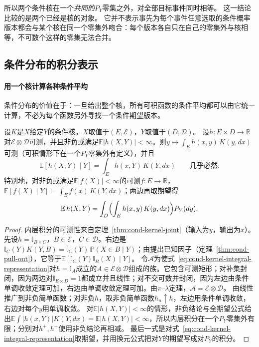 所以两个条件核在一个\emph{共同的}$P_Y$零集之外，对全部目标事件同时相等。
这一结论比较的是两个已经是核的对象。
它并不表示事先为每个事件任意选取的条件概率版本都会与某个核在同一个零集外吻合：每个版本各自只在自己的零集外与核相等，不可数个这样的零集无法合并。

\subsection{条件分布的积分表示}

\paragraph{用一个核计算各种条件平均}
条件分布的价值在于：一旦给出整个核，所有可积函数的条件平均都可以由它统一计算，不必为每个函数另外寻找一个条件期望版本。

\begin{theorem}[条件分布的积分表示]
\label{thm:cond-kernel-integral}
设$K$是$X$给定$Y$的条件核，$X$取值于$(E,\mathcal E)$，$Y$取值于$(D,\mathcal D)$。
设$h:E\times D\to\mathbb R$对$\mathcal E\otimes\mathcal D$可测，并且非负或满足$\mathbb E|h(X,Y)|<\infty$。则$y\mapsto\int_Eh(x,y)\,K(y,dx)$可测（可积情形下在一个$P_Y$零集外有定义），并且
\begin{equation}
  \mathbb E[h(X,Y)\mid Y]=\int_Eh(x,Y)\,K(Y,dx)\qquad\text{几乎必然}.
  \label{eq:cond-kernel-integral-representation}
\end{equation}
特别地，对非负或满足$\mathbb E|f(X)|<\infty$的可测$f:E\to\mathbb R$，$\mathbb E[f(X)\mid Y]=\int_Ef(x)\,K(Y,dx)$；两边再取期望得
\[
  \mathbb E\,h(X,Y)=\int_D\Bigl(\int_Eh(x,y)\,K(y,dx)\Bigr)P_Y(dy).
\]
\end{theorem}

\begin{proof}
内层积分的可测性来自定理~\ref{thm:cond-kernel-joint}（输入为$y$，输出为$x$）。
先设$h=\mathbb I_{B\times C}$，$B\in\mathcal E$，$C\in\mathcal D$。右边是$\mathbb I_C(Y)K(Y,B)=\mathbb I_C(Y)\,\mathbb P(X\in B\mid Y)$；由提出已知因子（定理~\ref{thm:cond-pull-out}），它等于$\mathbb E[\mathbb I_C(Y)\mathbb I_B(X)\mid Y]$。
令$\mathcal A$为使式~\eqref{eq:cond-kernel-integral-representation}对$h=\mathbb I_A$成立的$A\in\mathcal E\otimes\mathcal D$组成的族。它包含可测矩形；对补集封闭，因为两边对$\mathbb I_{E\times D}=1$都成立并且线性；对不交可数并封闭，因为左边由条件单调收敛定理可加，右边由单调收敛定理可加。由$\pi$--$\lambda$定理，$\mathcal A=\mathcal E\otimes\mathcal D$。
由线性推广到非负简单函数；对非负$h$，取非负简单函数$h_n\uparrow h$，左边用条件单调收敛，右边对每个$y$用单调收敛。
对$\mathbb E|h(X,Y)|<\infty$的情形，非负结论与全期望公式给出$\mathbb E\int|h(x,Y)|K(Y,dx)=\mathbb E|h(X,Y)|<\infty$，所以内层积分在一个$P_Y$零集外有限；分别对$h^+,h^-$使用非负结论再相减。
最后一式是对式~\eqref{eq:cond-kernel-integral-representation}取期望，并用换元公式把对$Y$的期望写成对$P_Y$的积分。
\end{proof}

